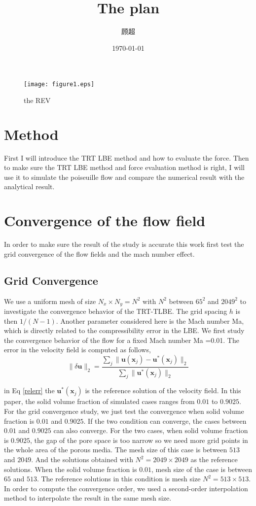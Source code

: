 \documentclass{article}
\author{顾超}  %
\date{\today}  %
\title{The plan}  %
\begin{document}
\maketitle

\begin{figure}[!ht]
  \centering
  \texttt{[image: figure1.eps]}
  \caption{the REV}\label{Fig.lable1}
\end{figure}
\section{Method}

First I will introduce the TRT LBE method and how to evaluate the force. Then to make sure the TRT LBE method and force evaluation method is right, I will use it to simulate the poiseuille flow and compare the numerical result with the analytical result.

\section{Convergence of the flow field}
In order to make sure the result of the study is accurate this work first test the grid convergence of the flow fields and the mach number effect.

\subsection{Grid Convergence}
We use a uniform mesh of size $N_x \times N_y=N^2$ with $N^2$ between $65^2$ and $2049^2$ to investigate the convergence behavior of the TRT-TLBE.
The grid spacing $h$ is then $1/(N-1)$.  Another parameter considered here is the Mach number Ma, which is directly related to the compressibility
error in the LBE. We first study the convergence behavior of the flow for a fixed Mach number Ma =0.01. The error in the velocity field is computed
as follows,
\begin{equation}\label{relerr}
  \|\delta \bm{u}\|_2=\frac{\sum_{j}\|\bm{u}(\bm{x}_j) -\bm u^\ast(\bm x_j)\|_2}{\sum_{j}\|\bm u^\ast(\bm x_j)\|_2}
\end{equation}

in Eq \ref{relerr} the $\bm u^\ast(\bm x_j)$ is the reference solution of the velocity field. In this paper, the solid volume fraction of simulated cases ranges from $0.01$ to $0.9025$. For the grid convergence study, we just test the convergence when solid volume fraction is $0.01$ and $0.9025$. If the two condition can converge, the cases between $0.01$ and $0.9025$ can also converge. For the two cases, when solid volume fraction is $0.9025$, the gap of the pore space is too narrow so we need more grid points in the whole area of the porous media. The mesh size of this case is between $513$ and $2049$. And the solutions obtained
with $N^2=2049\times 2049$ as the reference solutions.
When the solid volume fraction is $0.01$, mesh size of the case is between $65$ and $513$. The reference solutions in this condition is mesh size $N^2=513\times513$.
In order to compute the convergence order, we used a second-order interpolation method to interpolate the result in the same mesh size.
\end{document}
